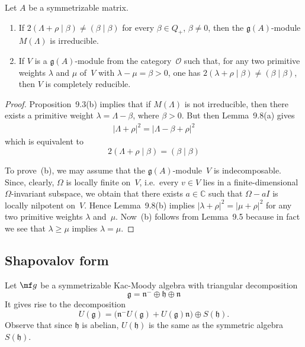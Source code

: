 \documentclass[12pt]{article}
\begin{document}
\begin{proposition}\label{prop:irred-crit}
    Let $A$ be a symmetrizable matrix.
    \begin{enumerate}[label=\textup{(\alph*)}]
        \item
              If $2(\Lambda + \rho \mid \beta) \ne (\beta \mid \beta)$ for every $\beta \in Q_+$, $\beta \ne 0$,
              then the $\mathfrak{g}(A)$-module $M(\Lambda)$ is irreducible.

        \item
              If $V$ is a $\mathfrak{g}(A)$-module from the category~$\mathcal{O}$ such that,
              for any two primitive weights $\lambda$ and $\mu$ of~$V$ with $\lambda - \mu = \beta > 0$,
              one has $2(\lambda + \rho \mid \beta) \ne (\beta \mid \beta)$,
              then $V$ is completely reducible.
    \end{enumerate}

    \begin{proof}
        Proposition~9.3(b) implies that if $M(\Lambda)$ is not irreducible,
        then there exists a primitive weight $\lambda = \Lambda - \beta$, where $\beta > 0$.
        But then Lemma~9.8(a) gives
        \begin{align*}
            |\Lambda + \rho|^2 = |\Lambda - \beta + \rho|^2
        \end{align*}
        which is equivalent to
        \[2(\Lambda + \rho \mid \beta) = (\beta \mid \beta)\]


        To prove~(b), we may assume that the $\mathfrak{g}(A)$-module~$V$ is indecomposable.
        Since, clearly, $\Omega$ is locally finite on~$V$, i.e.\ every $v \in V$
        lies in a finite-dimensional $\Omega$-invariant subspace, we obtain that there exists
        $a \in \mathbb{C}$ such that $\Omega - aI$ is locally nilpotent on~$V$.
        Hence Lemma~9.8(b) implies $|\lambda + \rho|^2 = |\mu + \rho|^2$
        for any two primitive weights $\lambda$ and~$\mu$.
        Now~(b) follows from Lemma~9.5 because in fact we see that $\lambda \ge \mu$ implies $\lambda = \mu$.
    \end{proof}
\end{proposition}


\subsection{Shapovalov form}
Let $\mf g$ be a symmetrizable Kac-Moody algebra with triangular decomposition
\[
\mathfrak{g} = \mathfrak{n}^- \oplus \mathfrak{h} \oplus \mathfrak{n}
\]
It gives rise to the decomposition
\begin{equation}
U(\mathfrak{g})
= \bigl(\mathfrak{n}^- U(\mathfrak{g}) + U(\mathfrak{g}) \mathfrak{n}\bigr)
  \oplus S(\mathfrak{h}).
\end{equation}
Observe that since $\mathfrak{h}$ is abelian, $U(\mathfrak{h})$ is the same as the symmetric algebra $S(\mathfrak{h})$.
\end{document}
